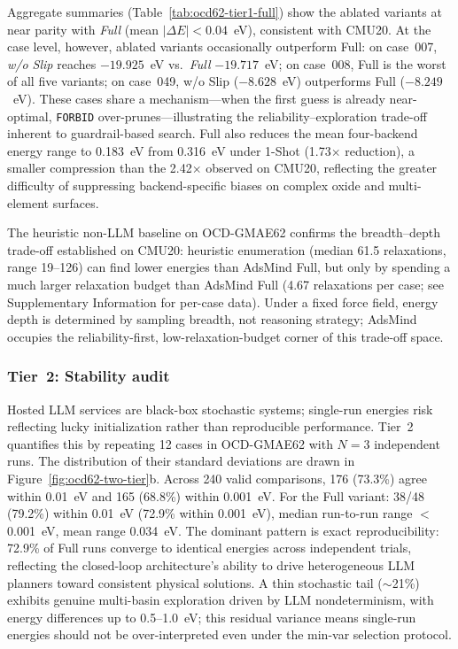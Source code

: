 Aggregate summaries (Table~\ref{tab:ocd62-tier1-full}) show the ablated variants at near parity with \textit{Full} (mean $|\Delta E| < 0.04$~eV), consistent with CMU20.
At the case level, however, ablated variants occasionally outperform Full: on case~007, \textit{w/o Slip} reaches $-19.925$~eV vs.\ \textit{Full} $-19.717$~eV; on case~008, Full is the worst of all five variants; on case~049, w/o Slip ($-8.628$~eV) outperforms Full ($-8.249$~eV).
These cases share a mechanism---when the first guess is already near-optimal, \texttt{FORBID} over-prunes---illustrating the reliability--exploration trade-off inherent to guardrail-based search.
Full also reduces the mean four-backend energy range to 0.183~eV from 0.316~eV under 1-Shot (1.73$\times$ reduction), a smaller compression than the 2.42$\times$ observed on CMU20, reflecting the greater difficulty of suppressing backend-specific biases on complex oxide and multi-element surfaces.

The heuristic non-LLM baseline on OCD-GMAE62 confirms the breadth--depth trade-off established on CMU20: heuristic enumeration (median 61.5 relaxations, range 19--126) can find lower energies than AdsMind Full, but only by spending a much larger relaxation budget than AdsMind Full (4.67 relaxations per case; see Supplementary Information for per-case data).
Under a fixed force field, energy depth is determined by sampling breadth, not reasoning strategy; AdsMind occupies the reliability-first, low-relaxation-budget corner of this trade-off space.

\subsubsection{Tier~2: Stability audit}

Hosted LLM services are black-box stochastic systems; single-run energies risk reflecting lucky initialization rather than reproducible performance.
Tier~2 quantifies this by repeating 12 cases in OCD-GMAE62 with $N=3$ independent runs. The distribution of their standard deviations are drawn in Figure~\ref{fig:ocd62-two-tier}b.
Across 240 valid comparisons, 176 (73.3\%) agree within 0.01~eV and 165 (68.8\%) within 0.001~eV.
For the Full variant: 38/48 (79.2\%) within 0.01~eV (72.9\% within 0.001~eV), median run-to-run range $<$0.001~eV, mean range 0.034~eV.
The dominant pattern is exact reproducibility: 72.9\% of Full runs converge to identical energies across independent trials, reflecting the closed-loop architecture's ability to drive heterogeneous LLM planners toward consistent physical solutions.
A thin stochastic tail ($\sim$21\%) exhibits genuine multi-basin exploration driven by LLM nondeterminism, with energy differences up to 0.5--1.0~eV; this residual variance means single-run energies should not be over-interpreted even under the min-var selection protocol.

